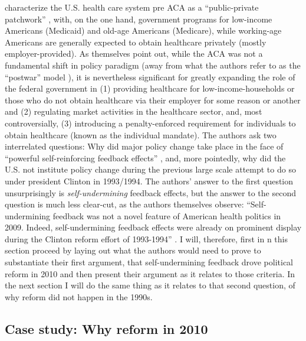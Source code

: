\documentclass[11pt]{article}
\begin{document}
\textcite[][]{Jacobs2014} characterize the U.S. health care system pre ACA as a \enquote{public-private patchwork} , with, on the one hand, government programs for low-income Americans (Medicaid) and old-age Americans (Medicare), while working-age Americans are generally expected to obtain healthcare privately (mostly employer-provided). As \textcite[][]{Jacobs2014} themselves point out, while the ACA was not a fundamental shift in policy paradigm (away from what the authors refer to as the \enquote{postwar} model ), it is nevertheless significant for greatly expanding the role of the federal government in (1) providing healthcare for low-income-households or those who do not obtain healthcare via their employer for some reason or another and (2) regulating market activities in the healthcare sector, and, most controversially, (3) introducing a penalty-enforced requirement for individuals to obtain healthcare (known as the individual mandate). The authors ask two interrelated questions: Why did major policy change take place in the face of \enquote{powerful self-reinforcing feedback effects} \parencite[][p. 451]{Jacobs2014}, and, more pointedly, why did the U.S. not institute policy change during the previous large scale attempt to do so under president Clinton in 1993/1994. The authors' answer to the first question unsurprisingly is \textit{self-undermining} feedback effects, but the answer to the second question is much less clear-cut, as the authors themselves observe: \enquote{Self-undermining feedback was not a novel feature of American health politics in 2009. Indeed, self-undermining feedback effects were already on prominent display during the Clinton reform effort of 1993-1994} \parencite[][p. 451]{Jacobs2014}. I will, therefore, first in n this section proceed by laying out what the authors would need to prove to substantiate their first argument, that self-undermining feedback drove political reform in 2010 and then present their argument as it relates to those criteria. In the next section I will do the same thing as it relates to that second question, of why reform did not happen in the 1990s.

\subsection*{Case study: Why reform in 2010}
\end{document}
